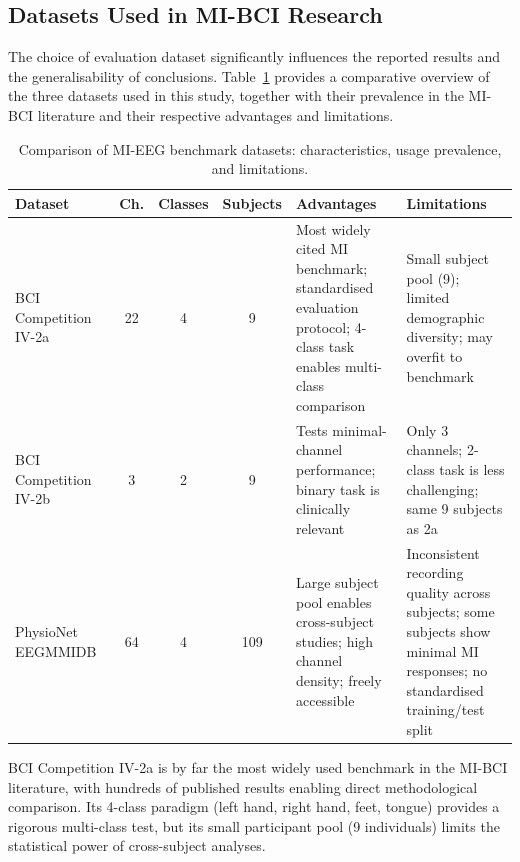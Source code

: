 \documentclass[12pt, a4paper]{article}
\begin{document}
\subsection{Datasets Used in MI-BCI Research}

The choice of evaluation dataset significantly influences the reported results and the generalisability of conclusions. Table~\ref{tab:lit_datasets} provides a comparative overview of the three datasets used in this study, together with their prevalence in the MI-BCI literature and their respective advantages and limitations.

\begin{table}[htbp]
\centering
\caption{Comparison of MI-EEG benchmark datasets: characteristics, usage prevalence, and limitations.}
\label{tab:lit_datasets}
\begin{tabular}{@{} >{\raggedright\arraybackslash}p{2.8cm} c c c >{\raggedright\arraybackslash}p{3.5cm} >{\raggedright\arraybackslash}p{3.5cm} @{}}
\toprule
\textbf{Dataset} & \textbf{Ch.} & \textbf{Classes} & \textbf{Subjects} & \textbf{Advantages} & \textbf{Limitations} \\
\midrule
BCI Competition IV-2a~\cite{tangermann2012bci} & 22 & 4 & 9 & Most widely cited MI benchmark; standardised evaluation protocol; 4-class task enables multi-class comparison & Small subject pool (9); limited demographic diversity; may overfit to benchmark \\[6pt]
BCI Competition IV-2b~\cite{tangermann2012bci} & 3 & 2 & 9 & Tests minimal-channel performance; binary task is clinically relevant & Only 3 channels; 2-class task is less challenging; same 9 subjects as 2a \\[6pt]
PhysioNet EEGMMIDB~\cite{goldberger2000physiobank} & 64 & 4 & 109 & Large subject pool enables cross-subject studies; high channel density; freely accessible & Inconsistent recording quality across subjects; some subjects show minimal MI responses; no standardised training/test split \\
\bottomrule
\end{tabular}
\end{table}

BCI Competition IV-2a is by far the most widely used benchmark in the MI-BCI literature, with hundreds of published results enabling direct methodological comparison. Its 4-class paradigm (left hand, right hand, feet, tongue) provides a rigorous multi-class test, but its small participant pool (9 individuals) limits the statistical power of cross-subject analyses.
\end{document}

